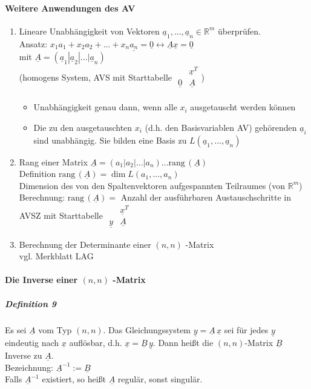 \documentclass[a4paper]{scrartcl}
\begin{document}
\paragraph{Weitere Anwendungen des AV}
\begin{enumerate}
\item Lineare Unabhängigkeit von Vektoren $\underline{a}_1, ... , \underline{a}_n \in \mathbb{R}^m$ überprüfen.\\
Ansatz: $x_1a_1 + x_2 a_2 + ... + x_n\underline{a_n} = \underline{0} \leftrightarrow \underline{A} \underline{x} = \underline{0}$ \\
mit $\underline{A} = (\underline{a}_1 | \underline{a}_2 | ... | \underline{a}_n)$\\
(homogens System, \textsc{AVS} mit Starttabelle $\begin{array}{c|c} & \underline{x}^T \\ \hline \underline{0} & \underline{A}\\ \end{array} $)
\begin{itemize}
\item Unabhängigkeit genau dann, wenn alle $x_i$ ausgetauscht werden können
\item Die zu den ausgetauschten $x_i$ (d.h. den Basisvariablen \textsc{AV}) gehörenden $\underline{a}_i$ sind unabhängig. Sie bilden eine Basis zu $L(\underline{a}_1,...,\underline{a}_n)$
\end{itemize}
\item Rang einer Matrix $\underline{A}= (a_1 | a_2 | ... | a_n) ... \text{rang}\, (\underline{A})$\\
Definition $\text{rang} \, (\underline{A}) = \dim{L (a_1, ... ,a_n)}$\\
Dimension des von den Spaltenvektoren aufgespannten Teilraumes (von $\mathbb{R}^m $)\\
Berechnung: $\text{rang}\, (\underline{A}) =$ Anzahl der ausführbaren Austauschschritte in \textsc{AVSZ} mit Starttabelle $\begin{array}{c|c} & \underline{x}^T\\ \hline \underline{y} & \underline{A} \end{array}$
\item Berechnung der Determinante einer $(n,n)$ -Matrix\\
vgl. Merkblatt LAG
\end{enumerate}

\paragraph{Die Inverse einer $(n,n)$ -Matrix}
\subparagraph{Definition 9} Es sei $\underline{A}$ vom Typ $(n,n)$. Das Gleichungssystem $\underline{y} = \underline{A}\, \underline{x}$ sei für jedes $\underline{y}$ eindeutig nach $\underline{x}$ auflösbar, d.h. $\underline{x} = \underline{B} \, \underline{y}$. Dann heißt die $(n,n)$-Matrix $\underline{B}$ Inverse zu $\underline{A}$.\\
Bezeichnung: $\underline{A}^{-1} := \underline{B}$\\
Falls $\underline{A}^{-1}$ existiert, so heißt $\underline{A}$ regulär, sonst singulär.
\end{document}
